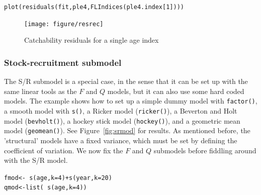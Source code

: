 \documentclass[a4paper,english,10pt]{article}\usepackage[]{graphicx}\usepackage[]{color}
\makeatletter
\newcommand{\hlnum}[1]{\textcolor[rgb]{0.2,0.2,0.2}{#1}}%
\newcommand{\hlopt}[1]{\textcolor[rgb]{0.2,0.2,0.2}{#1}}%
\newcommand{\hlstd}[1]{\textcolor[rgb]{0,0,0}{#1}}%
\newcommand{\hlkwb}[1]{\textcolor[rgb]{0.361,0.506,0.596}{#1}}%
\newcommand{\hlkwc}[1]{\textcolor[rgb]{0.361,0.506,0.596}{#1}}%
\newcommand{\hlkwd}[1]{\textcolor[rgb]{0.361,0.506,0.596}{#1}}%
\newenvironment{kframe}{%
 \def\at@end@of@kframe{}%
 \ifinner\ifhmode%
  \def\at@end@of@kframe{\end{minipage}}%
  \begin{minipage}{\columnwidth}%
 \fi\fi%
 \def\FrameCommand##1{\hskip\@totalleftmargin \hskip-\fboxsep
 \colorbox{shadecolor}{##1}\hskip-\fboxsep
     \hskip-\linewidth \hskip-\@totalleftmargin \hskip\columnwidth}%
 \MakeFramed {\advance\hsize-\width
   \@totalleftmargin\z@ \linewidth\hsize
   \@setminipage}}%
 {\par\unskip\endMakeFramed%
 \at@end@of@kframe}
\newenvironment{knitrout}{}{} %
\newcommand{\code}[1]{{\texttt{#1}}}
\makeatother
\begin{document}
\begin{knitrout}
\color{fgcolor}\begin{kframe}
\begin{alltt}
\hlkwd{plot}\hlstd{(}\hlkwd{residuals}\hlstd{(fit, ple4,} \hlkwd{FLIndices}\hlstd{(ple4.index[}\hlnum{1}\hlstd{])))}
\end{alltt}
\end{kframe}\begin{figure}[H]


{\centering \texttt{[image: figure/resrec]} 

}

\caption[Catchability residuals for a single age index]{Catchability residuals for a single age index\label{fig:resrec}}
\end{figure}


\end{knitrout}

\subsubsection{Stock-recruitment submodel}

The S/R submodel is a special case, in the sense that it can be set up with the same linear tools as the $F$ and $Q$ models, but it can also use some hard coded models. The example shows how to set up a simple dummy model with \code{factor()}, a smooth model with \code{s()}, a Ricker model (\code{ricker()}), a Beverton and Holt model (\code{bevholt()}), a hockey stick model (\code{hockey()}), and a geometric mean model (\code{geomean()}). See Figure~\ref{fig:srmod} for results. As mentioned before, the 'structural' models have a fixed variance, which must be set by defining the coefficient of variation. We now fix the $F$ and $Q$ submodels before fiddling around with the S/R model.

\begin{knitrout}
\color{fgcolor}\begin{kframe}
\begin{alltt}
\hlstd{fmod} \hlkwb{<-} \hlopt{~} \hlkwd{s}\hlstd{(age,} \hlkwc{k}\hlstd{=}\hlnum{4}\hlstd{)} \hlopt{+} \hlkwd{s}\hlstd{(year,} \hlkwc{k} \hlstd{=} \hlnum{20}\hlstd{)}
\hlstd{qmod} \hlkwb{<-} \hlkwd{list}\hlstd{(}\hlopt{~} \hlkwd{s}\hlstd{(age,} \hlkwc{k}\hlstd{=}\hlnum{4}\hlstd{))}
\end{alltt}
\end{kframe}
\end{knitrout}
\end{document}
